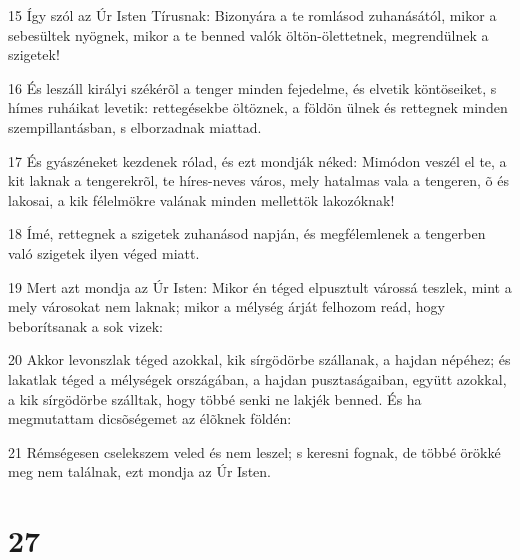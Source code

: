 \par 15 Így szól az Úr Isten Tírusnak: Bizonyára a te romlásod zuhanásától, mikor a sebesültek nyögnek, mikor a te benned valók öltön-ölettetnek, megrendülnek a szigetek!
\par 16 És leszáll királyi székérõl a tenger minden fejedelme, és elvetik köntöseiket, s hímes ruháikat levetik: rettegésekbe öltöznek, a földön ülnek és rettegnek minden szempillantásban, s elborzadnak miattad.
\par 17 És gyászéneket kezdenek rólad, és ezt mondják néked: Mimódon veszél el te, a kit laknak a tengerekrõl, te híres-neves város, mely hatalmas vala a tengeren, õ és lakosai, a kik félelmökre valának minden mellettök lakozóknak!
\par 18 Ímé, rettegnek a szigetek zuhanásod napján, és megfélemlenek a tengerben való szigetek ilyen véged miatt.
\par 19 Mert azt mondja az Úr Isten: Mikor én téged elpusztult várossá teszlek, mint a mely városokat nem laknak; mikor a mélység árját felhozom reád, hogy beborítsanak a sok vizek:
\par 20 Akkor levonszlak téged azokkal, kik sírgödörbe szállanak, a hajdan népéhez; és lakatlak téged a mélységek országában, a hajdan pusztaságaiban, együtt azokkal, a kik sírgödörbe szálltak, hogy többé senki ne lakjék benned. És ha megmutattam dicsõségemet az élõknek földén:
\par 21 Rémségesen cselekszem veled és nem leszel; s keresni fognak, de többé örökké meg nem találnak, ezt mondja az Úr Isten.

\chapter{27}

